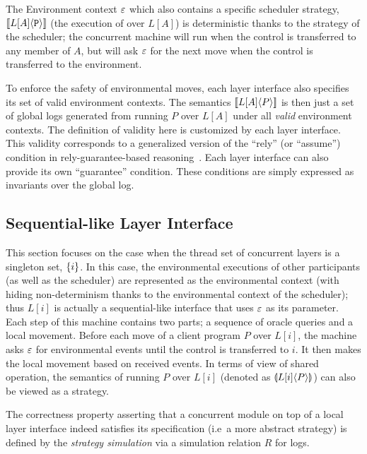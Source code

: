 The Environment context $\oracle$ which also contains a specific
scheduler strategy, $\sem{L[A]}{\codeinmath{P}}$ (the execution of  over $L[A]$) is
deterministic thanks to the strategy of the scheduler; 
the concurrent machine will run  when the control is
transferred to any member of $A$, but will ask $\oracle$ for the next 
move when the control is transferred to the environment.

To enforce the safety of environmental moves,
each layer interface also specifies its set of valid environment contexts.
The semantics $\sem{L[A]}{P}$ is then just a set of global logs
generated from running $P$ over $L[A]$ under all {\em valid}
environment contexts. 
The definition of validity here is customized
by each layer interface.
This validity  corresponds to a generalized version of
the ``rely'' (or ``assume'') condition in rely-guarantee-based
reasoning~\cite{feng07:sagl,vafeiadis:marriage,LRG,fu10:roch,sergey15}. Each layer interface can also
provide its own ``guarantee'' condition. These conditions  are simply expressed as
invariants over the global log. 


\subsection{Sequential-like Layer Interface} 

This section focuses on the case when the thread set of concurrent layers is a singleton set, $\set{i}$.
In this case, 
the environmental executions of other participants (as well as the scheduler) are
represented as  the environmental context (with hiding non-determinism thanks to the environmental context of the scheduler);
thus $L[i]$ is actually a sequential-like interface that uses $\oracle$ as its parameter. 
Each step of  this machine contains two parts; a sequence of oracle queries and a local movement.
Before each move of a client program $P$ over $L[i]$,
the  machine  asks $\oracle$ for environmental events until the control is transferred to $i$. 
It then makes the local movement based on
received events.
In terms of view of shared operation, the semantics of running $P$ over $L[i]$ (denoted as $\ssem{P}{L[i]}$) can also be viewed
as a strategy.


The correctness property asserting that a concurrent module on top of a local layer interface indeed
satisfies its specification (i.e\, a more abstract strategy) is defined
by the \emph{strategy simulation} via a simulation relation $R$ for logs.




